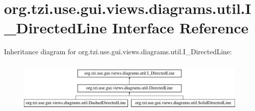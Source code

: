 \hypertarget{interfaceorg_1_1tzi_1_1use_1_1gui_1_1views_1_1diagrams_1_1util_1_1_i___directed_line}{\section{org.\-tzi.\-use.\-gui.\-views.\-diagrams.\-util.\-I\-\_\-\-Directed\-Line Interface Reference}
\label{interfaceorg_1_1tzi_1_1use_1_1gui_1_1views_1_1diagrams_1_1util_1_1_i___directed_line}
}
Inheritance diagram for org.\-tzi.\-use.\-gui.\-views.\-diagrams.\-util.\-I\-\_\-\-Directed\-Line\-:\begin{figure}[H]
\begin{center}
\leavevmode
\includegraphics[height=2.545455cm]{interfaceorg_1_1tzi_1_1use_1_1gui_1_1views_1_1diagrams_1_1util_1_1_i___directed_line}
\end{center}
\end{figure}
